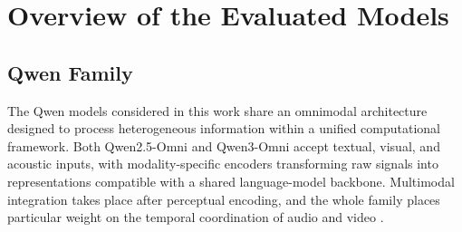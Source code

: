 \section{Overview of the Evaluated Models}
\subsection*{Qwen Family}
The Qwen models considered in this work share an omnimodal architecture designed to process heterogeneous information within a unified computational framework. Both Qwen2.5-Omni and Qwen3-Omni accept textual, visual, and acoustic inputs, with modality-specific encoders transforming raw signals into representations compatible with a shared language-model backbone. Multimodal integration takes place after perceptual encoding, and the whole family places particular weight on the temporal coordination of audio and video \cite{qwen25omni,qwen3omni}.
